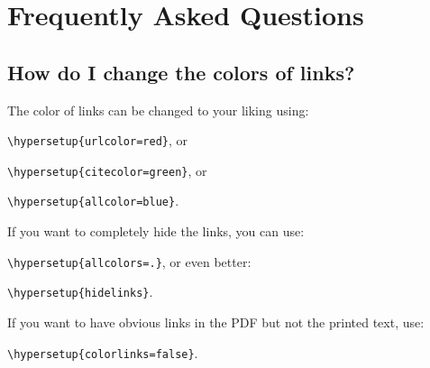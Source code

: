 \chapter{Frequently Asked Questions}%
\label{AppendixA}%

\section{How do I change the colors of links?}
The color of links can be changed to your liking using:



{\small\verb!\hypersetup{urlcolor=red}!}, or

{\small\verb!\hypersetup{citecolor=green}!}, or

{\small\verb!\hypersetup{allcolor=blue}!}.

\noindent If you want to completely hide the links, you can use:

{\small\verb!\hypersetup{allcolors=.}!}, or even better: 

{\small\verb!\hypersetup{hidelinks}!}.

\noindent If you want to have obvious links in the PDF but not the printed text, use:

{\small\verb!\hypersetup{colorlinks=false}!}.
